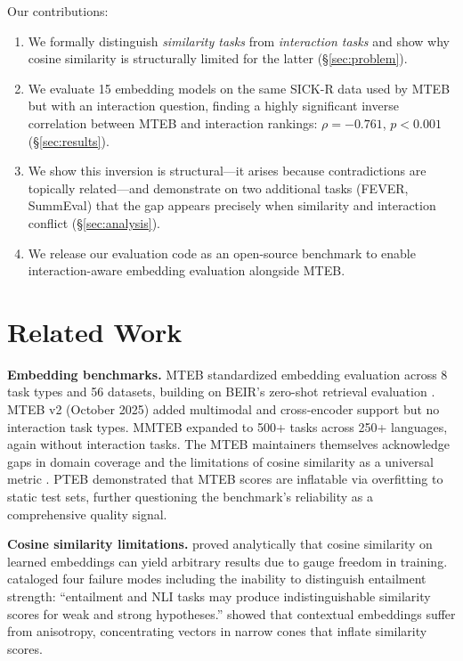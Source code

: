 \documentclass{article}
\begin{document}
Our contributions:

\begin{enumerate}[leftmargin=*, itemsep=2pt]
    \item We formally distinguish \emph{similarity tasks} from \emph{interaction tasks} and show why cosine similarity is structurally limited for the latter (\S\ref{sec:problem}).

    \item We evaluate 15 embedding models on the same SICK-R data used by MTEB but with an interaction question, finding a highly significant inverse correlation between MTEB and interaction rankings: $\rho = -0.761$, $p < 0.001$ (\S\ref{sec:results}).

    \item We show this inversion is structural---it arises because contradictions are topically related---and demonstrate on two additional tasks (FEVER, SummEval) that the gap appears precisely when similarity and interaction conflict (\S\ref{sec:analysis}).

    \item We release our evaluation code as an open-source benchmark to enable interaction-aware embedding evaluation alongside MTEB.
\end{enumerate}

\section{Related Work}
\label{sec:related}

\textbf{Embedding benchmarks.} MTEB \citep{muennighoff2023mteb} standardized embedding evaluation across 8 task types and 56 datasets, building on BEIR's zero-shot retrieval evaluation \citep{thakur2021beir}. MTEB v2 (October 2025) added multimodal and cross-encoder support but no interaction task types. MMTEB \citep{mmteb2025} expanded to 500+ tasks across 250+ languages, again without interaction tasks. The MTEB maintainers themselves acknowledge gaps in domain coverage and the limitations of cosine similarity as a universal metric \citep{chung2025maintaining}. PTEB \citep{pteb2025} demonstrated that MTEB scores are inflatable via overfitting to static test sets, further questioning the benchmark's reliability as a comprehensive quality signal.

\textbf{Cosine similarity limitations.} \citet{steck2024cosine} proved analytically that cosine similarity on learned embeddings can yield arbitrary results due to gauge freedom in training. \citet{you2025semantics} cataloged four failure modes including the inability to distinguish entailment strength: ``entailment and NLI tasks may produce indistinguishable similarity scores for weak and strong hypotheses.'' \citet{ethayarajh2019contextual} showed that contextual embeddings suffer from anisotropy, concentrating vectors in narrow cones that inflate similarity scores.
\end{document}
